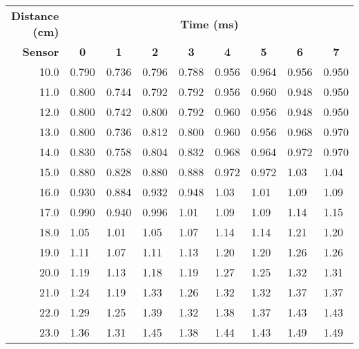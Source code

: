\begin{tabular}{|r|llllllll|}
\hline
    \textbf{Distance (\si{\centi\meter})}    & \multicolumn{8}{c|}{\textbf{Time (\si{\milli\second})}}            \\
    \textbf{Sensor}    & \multicolumn{1}{c}{\textbf{0}}  & \multicolumn{1}{c}{\textbf{1}}     & \multicolumn{1}{c}{\textbf{2}}     & \multicolumn{1}{c}{\textbf{3}}     & \multicolumn{1}{c}{\textbf{4}}     & \multicolumn{1}{c}{\textbf{5}}     & \multicolumn{1}{c}{\textbf{6}}     & \multicolumn{1}{c|}{\textbf{7}}     \\ \hline
    10.0                            & 0.790     & 0.736 & 0.796 & 0.788 & 0.956 & 0.964 & 0.956 & 0.950 \\
    11.0                            & 0.800     & 0.744 & 0.792 & 0.792 & 0.956 & 0.960 & 0.948 & 0.950 \\
    12.0                            & 0.800     & 0.742 & 0.800 & 0.792 & 0.960 & 0.956 & 0.948 & 0.950 \\
    13.0                            & 0.800     & 0.736 & 0.812 & 0.800 & 0.960 & 0.956 & 0.968 & 0.970 \\
    14.0                            & 0.830     & 0.758 & 0.804 & 0.832 & 0.968 & 0.964 & 0.972 & 0.970 \\
    15.0                            & 0.880     & 0.828 & 0.880 & 0.888 & 0.972 & 0.972 & 1.03  & 1.04  \\
    16.0                            & 0.930     & 0.884 & 0.932 & 0.948 & 1.03  & 1.01  & 1.09  & 1.09  \\
    17.0                            & 0.990     & 0.940 & 0.996 & 1.01  & 1.09  & 1.09  & 1.14  & 1.15  \\
    18.0                            & 1.05      & 1.01  & 1.05  & 1.07  & 1.14  & 1.14  & 1.21  & 1.20  \\
    19.0                            & 1.11      & 1.07  & 1.11  & 1.13  & 1.20  & 1.20  & 1.26  & 1.26  \\
    20.0                            & 1.19      & 1.13  & 1.18  & 1.19  & 1.27  & 1.25  & 1.32  & 1.31  \\
    21.0                            & 1.24      & 1.19  & 1.33  & 1.26  & 1.32  & 1.32  & 1.37  & 1.37  \\
    22.0                            & 1.29      & 1.25  & 1.39  & 1.32  & 1.38  & 1.37  & 1.43  & 1.43  \\
    23.0                            & 1.36      & 1.31  & 1.45  & 1.38  & 1.44  & 1.43  & 1.49  & 1.49  \\

\end{tabular}
